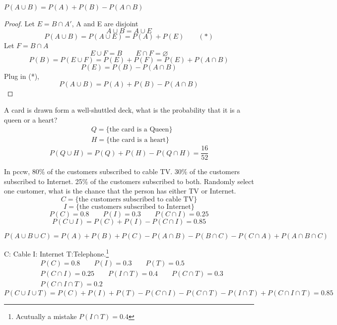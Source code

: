 \begin{prop}
 $ P(A \cup B)= P(A) +P(B) -P(A \cap B) $
\begin{proof}
Let $E = B \cap A' $, A and E are disjoint
  \[A \cup B = A \cup E\]
  \[P(A\cup B)=P(A \cup E)=P(A)+P(E)  \qquad (*)\]
Let $F= B\cap A$
  \[E \cup F =B \qquad E \cap F =\varnothing\]
  \[ P(B) = P(E \cup F)=P(E) + P(F)=P(E)+P(A\cap B)  \]
  \[P(E)= P(B)- P(A \cap B) \]
Plug in (*),\[  P(A \cup B)= P(A) +P(B) -P(A \cap B)  \]
\end{proof}
\end{prop}


\begin{exmp}
A card is drawn form a well-shuttled deck, what is the probability that it is a queen or a heart?
\begin{align*}
&Q=\{\text{the card is a Queen}\}\\
&H=\{\text{the card is a heart}\}
\end{align*}
\[P(Q \cup H)=P(Q)+P(H)-P(Q \cap H)=\frac{16}{52}\]
\end{exmp}

\begin{exmp}
In pccw, 80\% of the customers subscribed to cable TV. 30\% of the customers subscribed to Internet. 25\% of the customers subscribed to both.
Randomly select one customer, what is the chance that the person has either TV or Internet.
\[C=\{\text{the customers subscribed to cable TV}\}\]
\[I=\{\text{the customers subscribed to Internet} \}\]
\[P(C)=0.8 \qquad P(I)=0.3 \qquad P(C\cap I)=0.25\]
\[P(C\cup I)=P(C)+P(I)-P(C\cap I)=\boxed{0.85}\]
\end{exmp}

\begin{prop}
\[ P(A \cup B \cup C)=P(A)+P(B)+P(C)-P(A \cap B)-P(B \cap C)-P(C \cap A)+P(A \cap B \cap C) \]
\end{prop}

\begin{exmp}
C: Cable \qquad I: Internet \qquad T:Telephone.\footnote{Acutually a mistake $P(I\cap T)=0.4$}
\begin{align*}
&P(C)=0.8 \qquad P(I)=0.3 \qquad P(T)=0.5	\\
&P(C\cap I)=0.25 \qquad P(I\cap T)=0.4 \qquad P(C\cap T)=0.3\\
&P(C\cap I \cap T)=0.2
\end{align*}
\[P(C\cup I \cup T)=P(C)+P(I)+P(T)-P(C \cap I)-P(C \cap T)-P(I \cap T)+P(C \cap I \cap T)=\boxed{0.85}\]
\end{exmp}

